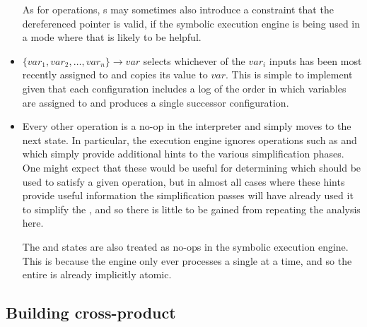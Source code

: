 \begin{itemize}
  As for  operations, s may sometimes also
  introduce a constraint that the dereferenced pointer is valid, if
  the symbolic execution engine is being used in a mode where that is
  likely to be helpful.

\item \state{$\Phi$} $\{var_1,var_2,\ldots{},var_n\} \rightarrow var$
  selects whichever of the $var_i$ inputs has been most recently
  assigned to and copies its value to $var$.  This is simple to
  implement given that each configuration includes a log of the order
  in which variables are assigned to and produces a single successor
  configuration.

\item
  Every other operation is a no-op in the interpreter and simply moves
  to the next state.  In particular, the execution engine ignores
  operations such as  and  which
  simply provide additional hints to the various \StateMachine
  simplification phases.  One might expect that these would be useful
  for determining which  should be used to satisfy a
  given  operation, but in almost all cases where these
  hints provide useful information the {\StateMachine} simplification
  passes will have already used it to simplify the {\StateMachine},
  and so there is little to be gained from repeating the analysis
  here.

  The  and  states are also
  treated as no-ops in the symbolic execution engine.  This is because
  the engine only ever processes a single {\StateMachine} at a time,
  and so the entire {\StateMachine} is already implicitly atomic.

\end{itemize}



\subsection{Building cross-product {\StateMachines}}
\label{sect:using:build_cross_product}

